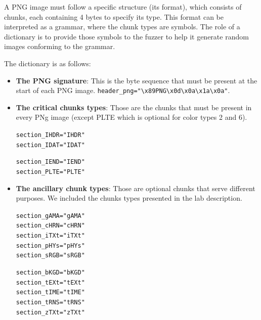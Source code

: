 \documentclass[letterpaper,twocolumn,10pt]{article}
\begin{document}
A PNG image must follow a specific structure (its format), which consists of chunks, each containing 4 bytes to specify its type. This format can be interpreted as a grammar, where the chunk types are symbols. The role of a dictionary is to provide those symbols to the fuzzer to help it generate random images conforming to the grammar.

The dictionary is as follows:

\begin{itemize}
    \item \textbf{The PNG signature}: This is the byte sequence that must be present at the start of each PNG image.
    \texttt{header\_png="\textbackslash x89PNG\textbackslash x0d\textbackslash x0a\textbackslash x1a\textbackslash x0a"}. 

    \item \textbf{The critical chunks types}: Those are the chunks that must be present in every PNg image (except PLTE which is optional for color types 2 and 6).
    
    \begin{minipage}[t]{0.3\columnwidth}
    \texttt{section\_IHDR="IHDR"\\ section\_IDAT="IDAT"}
    \end{minipage}
    \hfill
    \begin{minipage}[t]{0.4\columnwidth}
    \texttt{section\_IEND="IEND"\\ section\_PLTE="PLTE"}
    \end{minipage}
    
    \item \textbf{The ancillary chunk types}: Those are optional chunks that serve different purposes. We included the chunks types presented in the lab description.
    
    \begin{minipage}[t]{0.3\columnwidth}
    \texttt{section\_gAMA="gAMA"\\
    section\_cHRN="cHRN"\\
    section\_iTXt="iTXt"\\
    section\_pHYs="pHYs"\\
    section\_sRGB="sRGB"}
    \end{minipage}
    \hfill
    \begin{minipage}[t]{0.4\columnwidth}
    \texttt{section\_bKGD="bKGD"\\
    section\_tEXt="tEXt"\\
    section\_tIME="tIME"\\
    section\_tRNS="tRNS"\\
    section\_zTXt="zTXt"}
    \end{minipage}
\end{itemize}
\end{document}
